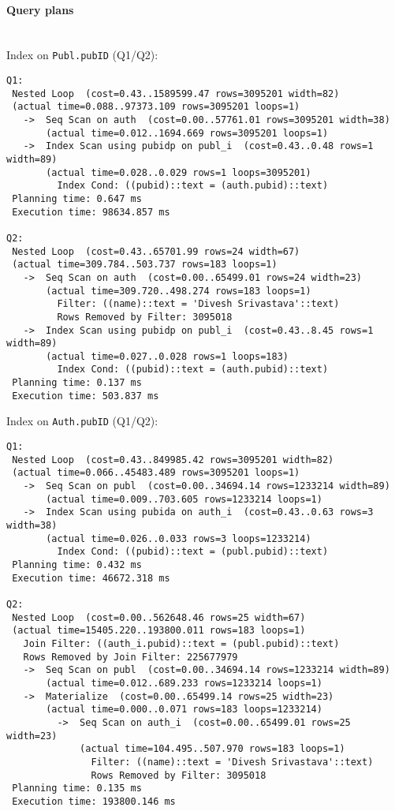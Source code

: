 \documentclass[11pt]{scrartcl}
\begin{document}
\paragraph{Query plans}\mbox{}\\

\noindent Index on {\tt Publ.pubID} (Q1/Q2):
{\small
\begin{verbatim}
Q1:
 Nested Loop  (cost=0.43..1589599.47 rows=3095201 width=82)
 (actual time=0.088..97373.109 rows=3095201 loops=1)
   ->  Seq Scan on auth  (cost=0.00..57761.01 rows=3095201 width=38)
       (actual time=0.012..1694.669 rows=3095201 loops=1)
   ->  Index Scan using pubidp on publ_i  (cost=0.43..0.48 rows=1 width=89)
       (actual time=0.028..0.029 rows=1 loops=3095201)
         Index Cond: ((pubid)::text = (auth.pubid)::text)
 Planning time: 0.647 ms
 Execution time: 98634.857 ms

Q2:
 Nested Loop  (cost=0.43..65701.99 rows=24 width=67)
 (actual time=309.784..503.737 rows=183 loops=1)
   ->  Seq Scan on auth  (cost=0.00..65499.01 rows=24 width=23)
       (actual time=309.720..498.274 rows=183 loops=1)
         Filter: ((name)::text = 'Divesh Srivastava'::text)
         Rows Removed by Filter: 3095018
   ->  Index Scan using pubidp on publ_i  (cost=0.43..8.45 rows=1 width=89)
       (actual time=0.027..0.028 rows=1 loops=183)
         Index Cond: ((pubid)::text = (auth.pubid)::text)
 Planning time: 0.137 ms
 Execution time: 503.837 ms

\end{verbatim}
}

\noindent Index on {\tt Auth.pubID} (Q1/Q2):
{\small
\begin{verbatim}
Q1:
 Nested Loop  (cost=0.43..849985.42 rows=3095201 width=82)
 (actual time=0.066..45483.489 rows=3095201 loops=1)
   ->  Seq Scan on publ  (cost=0.00..34694.14 rows=1233214 width=89)
       (actual time=0.009..703.605 rows=1233214 loops=1)
   ->  Index Scan using pubida on auth_i  (cost=0.43..0.63 rows=3 width=38)
       (actual time=0.026..0.033 rows=3 loops=1233214)
         Index Cond: ((pubid)::text = (publ.pubid)::text)
 Planning time: 0.432 ms
 Execution time: 46672.318 ms

Q2:
 Nested Loop  (cost=0.00..562648.46 rows=25 width=67)
 (actual time=15405.220..193800.011 rows=183 loops=1)
   Join Filter: ((auth_i.pubid)::text = (publ.pubid)::text)
   Rows Removed by Join Filter: 225677979
   ->  Seq Scan on publ  (cost=0.00..34694.14 rows=1233214 width=89)
       (actual time=0.012..689.233 rows=1233214 loops=1)
   ->  Materialize  (cost=0.00..65499.14 rows=25 width=23)
       (actual time=0.000..0.071 rows=183 loops=1233214)
         ->  Seq Scan on auth_i  (cost=0.00..65499.01 rows=25 width=23)
             (actual time=104.495..507.970 rows=183 loops=1)
               Filter: ((name)::text = 'Divesh Srivastava'::text)
               Rows Removed by Filter: 3095018
 Planning time: 0.135 ms
 Execution time: 193800.146 ms

\end{verbatim}
}
\end{document}
